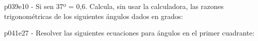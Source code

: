 \documentclass[spanish, 11pt]{exam}
\begin{document}
\begin{questions}
\begin{multicols}{2}
\begin{parts}
        \end{parts}
        \end{multicols}
        \question p039e10 - Si sen 37º = 0,6. Calcula, sin usar la calculadora, las razones trigonométricas de los siguientes ángulos dados en grados:
        \begin{multicols}{2} 
        \end{multicols}
        \question p041e27 - Resolver las siguientes ecuaciones para ángulos en el primer cuadrante:
        \begin{multicols}{1} 
\end{multicols}
\end{questions}
\end{document}
